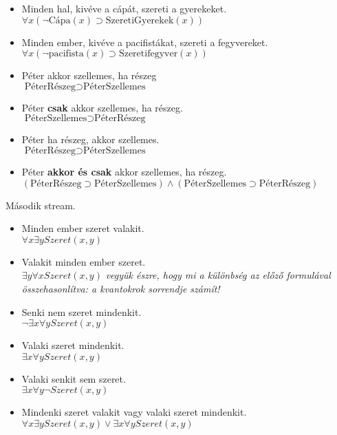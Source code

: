 \documentclass{article}
\begin{document}
\begin{itemize}
\item
 Minden hal, kivéve a cápát, szereti a gyerekeket. \\
$\forall x ( \neg \text{Cápa}(x) \supset \text{SzeretiGyerekek}(x))$

\item
 Minden ember, kivéve a pacifistákat, szereti a fegyvereket. \\
$\forall x ( \neg \text{pacifista}(x) \supset \text{Szeretifegyver}(x))$

\item
Péter akkor szellemes, ha részeg\\
$ \text{PéterRészeg} \supset  \text{PéterSzellemes}$

\item
Péter \textbf{csak} akkor szellemes, ha részeg.\\
$ \text{PéterSzellemes} \supset  \text{PéterRészeg}$

\item
Péter ha részeg, akkor szellemes.\\
$ \text{PéterRészeg} \supset  \text{PéterSzellemes}$


\item
Péter \textbf{akkor és csak} akkor szellemes, ha részeg.\\
$( \text{PéterRészeg} \supset  \text{PéterSzellemes})\wedge( \text{PéterSzellemes} \supset  \text{PéterRészeg})$

 \end{itemize}

Második stream.

\begin{itemize}
\item
 Minden ember szeret valakit. \\
$\forall x \exists y Szeret(x, y)$

\item
Valakit minden ember szeret. \\
$\exists y \forall x  Szeret(x, y)$ \textit{vegyük észre, hogy mi a különbség az előző formulával összehasonlítva: a kvantokrok sorrendje számít!}

\item
Senki nem szeret mindenkit. \\
$\neg \exists x \forall y  Szeret(x, y)$

\item
Valaki szeret mindenkit. \\
$\exists x \forall y  Szeret(x, y)$


\item
Valaki senkit sem szeret. \\
$\exists x  \forall y  \neg  Szeret (x, y)$

\item
Mindenki szeret valakit vagy valaki szeret mindenkit. \\
$ \forall x \exists y Szeret(x, y) \vee \exists x \forall y  Szeret(x, y)$

 \end{itemize}
 
\end{document}
